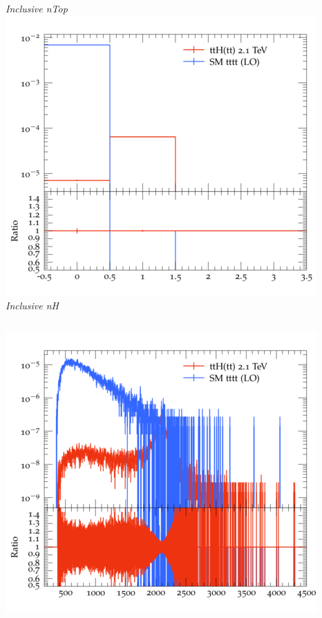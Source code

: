 \documentclass{beamer}
\begin{document}
\begin{frame}
\begin{columns}
\textit{\small Inclusive nTop}
\includegraphics[width=\textwidth]{../plots/ttH_2100/tttt_ttH/Inclusive_nH.png}\\
\textit{\small Inclusive nH}
\end{columns}
\begin{columns}
\includegraphics[width=\textwidth]{../plots/ttH_2100/tttt_ttH/Inclusive_InvM_ttbar12.png}\\

\end{columns}
\end{frame}
\end{document}

